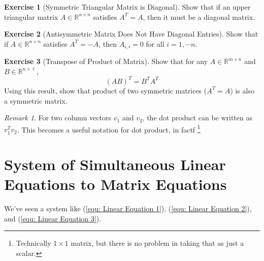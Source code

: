 \documentclass[12pt, a4paper]{article}
\newcommand{\R}{\mathbb{R}}
\theoremstyle{remark}
\newtheorem{remark}{Remark}
\theoremstyle{definition}
\newtheorem{exercise}{Exercise}
\numberwithin{equation}{section}
\numberwithin{definition}{section}
\numberwithin{example}{section}
\numberwithin{exercise}{section}
\numberwithin{remark}{section}
\numberwithin{figure}{section}
\begin{document}
\begin{exercise}[Symmetric Triangular Matrix is Diagonal]
    Show that if an upper triangular matrix $A \in \R^{n \times n}$ satisfies $A^T = A$, then it must be a diagonal matrix.
\end{exercise}
\begin{exercise}[Antisymmetric Matrix Does Not Have Diagonal Entries]
    Show that if $A \in \R^{n \times n}$ satisfies $A^T = -A$, then $A_{i,i} = 0$ for all $i = 1, \cdots n$.
\end{exercise}
\begin{exercise}[Transpose of Product of Matrix]
    Show that for any $A \in \R^{m \times n}$ and $B \in \R^{n \times \ell}$,
    \begin{equation*}
        \left( AB \right)^T = B^T A^T
    \end{equation*}
    Using this result, show that product of two symmetric matrices ($A^T = A$) is also a symmetric matrix.
\end{exercise}
\begin{remark}
    For two column vectors $v_1$ and $v_2$, the dot product can be written as $v_1^T v_2$.
    This becomes a useful notation for dot product, in factf
    \footnote{
    Technically $1 \times 1$ matrix, but there is no problem in taking that as just a scalar.}
\end{remark}

\section{System of Simultaneous Linear Equations to Matrix Equations}
We've seen a system like (\ref{equ: Linear Equation 1}), (\ref{equ: Linear Equation 2}), and (\ref{equ: Linear Equation 3}).
\end{document}
